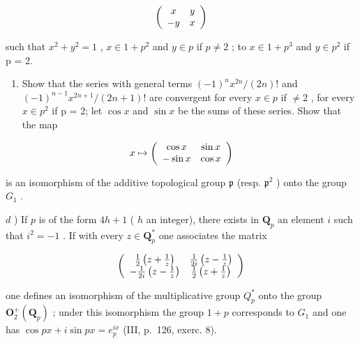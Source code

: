 \[
\left( \begin{array}{c c} x & y \\ - y & x \end{array} \right)
\]

such that \(x^{2} + y^{2} = 1\) , \(x \in 1 + p^{2}\) and \(y \in p\) if \(p \neq 2\) ; to \(x \in 1 + p^{3}\) and \(y \in p^{2}\) if p = 2.

\begin{enumerate}
\def\labelenumi{\alph{enumi})}
\setcounter{enumi}{2}
\tightlist
\item
  Show that the series with general terms \((-1)^{n} x^{2n}/(2n)!\) and \((-1)^{n-1} x^{2n+1}/(2n+1)!\) are convergent for every \(x \in p\) if \(\neq 2\) , for every \(x \in p^{2}\) if p = 2; let \(\cos x\) and \(\sin x\) be the sums of these series. Show that the map
\end{enumerate}

\[
x \mapsto \left( \begin{array}{c c} \cos x & \sin x \\ - \sin x & \cos x \end{array} \right)
\]

is an isomorphism of the additive topological group \(\mathfrak{p}\) (resp. \(\mathfrak{p}^2\) ) onto the group \(G_1\) .

\(d\) ) If \(p\) is of the form \(4h + 1\) ( \(h\) an integer), there exists in \(\mathbf{Q}_p\) an element \(i\) such that \(i^2 = -1\) . If with every \(z \in \mathbf{Q}_p^*\) one associates the matrix

\[
\left( \begin{array}{c c} \frac {1}{2} \left(z + \frac {1}{z}\right) & \frac {1}{2 i} \left(z - \frac {1}{z}\right) \\ - \frac {1}{2 i} \left(z - \frac {1}{z}\right) & \frac {1}{2} \left(z + \frac {1}{z}\right) \end{array} \right)
\]

one defines an isomorphism of the multiplicative group \(Q_{p}^{*}\) onto the group \(\mathbf{O}_{2}^{+}(\mathbf{Q}_{p})\) ; under this isomorphism the group \(1 + p\) corresponds to \(G_{1}\) and one has \(\cos px + i \sin px = e_{p}^{ix}\) (III, p.~126, exerc. 8).

